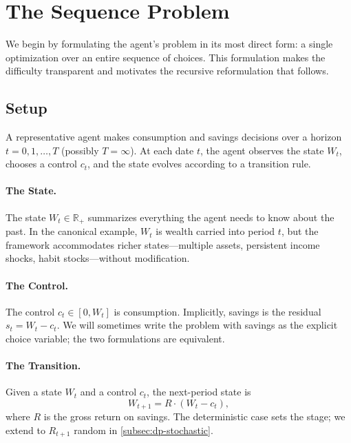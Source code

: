 \section{The Sequence Problem}
\label{sec:dp-sequence-problem}

We begin by formulating the agent's problem in its most direct form: a single optimization over an entire sequence of choices. This formulation makes the difficulty transparent and motivates the recursive reformulation that follows.

\subsection{Setup}
\label{subsec:dp-setup}

A representative agent makes consumption and savings decisions over a horizon $t = 0, 1, \ldots, T$ (possibly $T = \infty$). At each date $t$, the agent observes the state $W_t$, chooses a control $c_t$, and the state evolves according to a transition rule.

\paragraph{The State.}
The state $W_t \in \mathbb{R}_+$ summarizes everything the agent needs to know about the past. In the canonical example, $W_t$ is wealth carried into period $t$, but the framework accommodates richer states---multiple assets, persistent income shocks, habit stocks---without modification.

\paragraph{The Control.}
The control $c_t \in [0, W_t]$ is consumption. Implicitly, savings is the residual $s_t = W_t - c_t$. We will sometimes write the problem with savings as the explicit choice variable; the two formulations are equivalent.

\paragraph{The Transition.}
Given a state $W_t$ and a control $c_t$, the next-period state is
\begin{equation}
W_{t+1} = R \cdot (W_t - c_t),
\label{eq:dp-transition-deterministic}
\end{equation}
where $R$ is the gross return on savings. The deterministic case sets the stage; we extend to $R_{t+1}$ random in \cref{subsec:dp-stochastic}.

